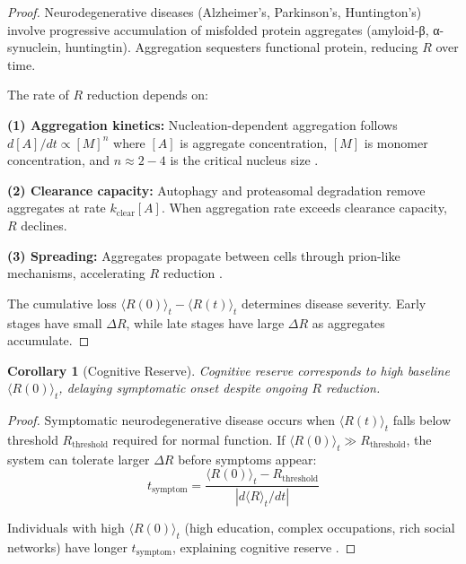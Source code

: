 \documentclass[11pt,twocolumn,a4paper]{article}
\newtheorem{corollary}[theorem]{Corollary}
\theoremstyle{definition}
\theoremstyle{remark}
\begin{document}
\begin{proof}
Neurodegenerative diseases (Alzheimer's, Parkinson's, Huntington's) involve progressive accumulation of misfolded protein aggregates (amyloid-β, α-synuclein, huntingtin). Aggregation sequesters functional protein, reducing $R$ over time.

The rate of $R$ reduction depends on:

\textbf{(1) Aggregation kinetics:} Nucleation-dependent aggregation follows $d[A]/dt \propto [M]^n$ where $[A]$ is aggregate concentration, $[M]$ is monomer concentration, and $n \approx 2-4$ is the critical nucleus size \citep{knowles2014amyloid}.

\textbf{(2) Clearance capacity:} Autophagy and proteasomal degradation remove aggregates at rate $k_{\mathrm{clear}}[A]$. When aggregation rate exceeds clearance capacity, $R$ declines.

\textbf{(3) Spreading:} Aggregates propagate between cells through prion-like mechanisms, accelerating $R$ reduction \citep{jucker2013self}.

The cumulative loss $\langle R(0) \rangle_t - \langle R(t) \rangle_t$ determines disease severity. Early stages have small $\Delta R$, while late stages have large $\Delta R$ as aggregates accumulate.
\end{proof}

\begin{corollary}[Cognitive Reserve]
\label{cor:cognitive_reserve}
Cognitive reserve corresponds to high baseline $\langle R(0) \rangle_t$, delaying symptomatic onset despite ongoing $R$ reduction.
\end{corollary}

\begin{proof}
Symptomatic neurodegenerative disease occurs when $\langle R(t) \rangle_t$ falls below threshold $R_{\mathrm{threshold}}$ required for normal function. If $\langle R(0) \rangle_t \gg R_{\mathrm{threshold}}$, the system can tolerate larger $\Delta R$ before symptoms appear:
\begin{equation}
t_{\mathrm{symptom}} = \frac{\langle R(0) \rangle_t - R_{\mathrm{threshold}}}{|d\langle R \rangle_t/dt|}
\label{eq:symptom_onset}
\end{equation}

Individuals with high $\langle R(0) \rangle_t$ (high education, complex occupations, rich social networks) have longer $t_{\mathrm{symptom}}$, explaining cognitive reserve \citep{stern2012cognitive}.
\end{proof}
\end{document}
